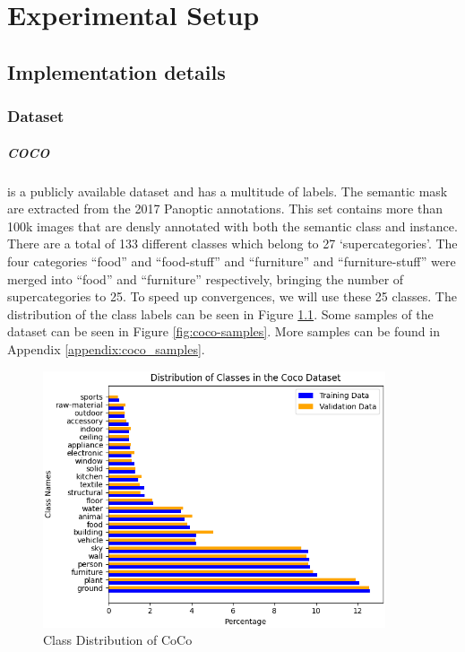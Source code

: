 \chapter{Experimental Setup}\label{chapter:second_real_chapter}

\section{Implementation details}
\subsection{Dataset}
\paragraph{COCO~\cite{lin2015microsoftcococommonobjects}} is a publicly available dataset and has a multitude of labels. The semantic mask are extracted from the 2017 Panoptic annotations. This set contains more than 100k images that are densly annotated with both the semantic class and instance. There are a total of 133 different classes which belong to 27 `supercategories'. The four categories ``food'' and ``food-stuff'' and ``furniture'' and ``furniture-stuff'' were merged into ``food'' and ``furniture'' respectively, bringing the number of supercategories to 25. To speed up convergences, we will use these 25 classes. The distribution of the class labels can be seen in Figure \ref{fig:coco-class-distribution}. Some samples of the dataset can be seen in Figure \ref{fig:coco-samples}. More samples can be found in Appendix \ref{appendix:coco_samples}. 


\begin{figure}[h]
    \centering
    \includegraphics[width=0.9\textwidth]{figures/datasets/coco/class_distribution.png}
    \caption{Class Distribution of CoCo}
    \label{fig:coco-class-distribution}
\end{figure}

